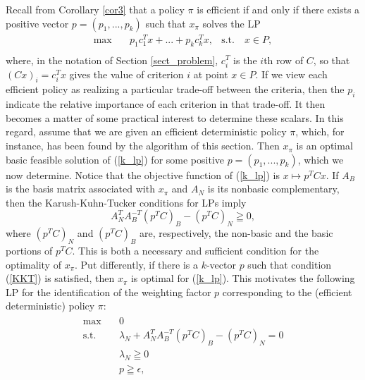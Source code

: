\documentclass{article}
\theoremstyle{definition}
\numberwithin{equation}{section}
\begin{document}

Recall from Corollary \ref{cor3} that a policy $\pi$ is efficient if and only if there exists a positive vector $p = (p_1, ..., p_k)$ such that $x_{\pi}$ solves the LP \begin{equation}
\tag{$P_p$}
\label{k_lp}
\begin{aligned}
\max \quad & p_{1}c_1^{T}x + ... + p_{k}c_k^{T}x, & \textrm{s.t.} \quad x \in P,\\
\end{aligned}
\end{equation}
where, in the notation of Section \ref{sect_problem}, $c_{i}^T$ is the $i$th row of $C$, so that $(Cx)_i=c_{i}^{T}x$ gives the value of criterion $i$ at point $x \in P$. If we view each efficient policy as realizing a particular trade-off between the criteria, then the $p_i$ indicate the relative importance of each criterion in that trade-off. It then becomes a matter of some practical interest to determine these scalars. In this regard, assume that we are given an efficient deterministic policy $\pi$, which, for instance, has been found by the algorithm of this section. Then $x_{\pi}$ is an optimal 
basic feasible solution of (\ref{k_lp}) for some positive $p = (p_1, ..., p_k)$, which we now determine. Notice that the objective function of (\ref{k_lp}) is $x \mapsto p^{T}Cx$. If $A_B$ is the basis matrix associated with $x_{\pi}$ and $A_N$ is its nonbasic complementary, then the Karush-Kuhn-Tucker conditions for LPs \cite{14} imply 
\begin{equation}
\label{KKT}
 A_N^{T}A_B^{-T}(p^{T}C)_B - (p^TC)_N \geqq 0,
\end{equation}   
where $(p^{T}C)_N$ and $(p^{T}C)_B$ are, respectively, the non-basic and the basic portions of $p^{T}C$. This is both a necessary and sufficient condition for the optimality of $x_{\pi}$. Put differently, if there is a $k$-vector $p$ such that condition (\ref{KKT}) is satisfied, then $x_{\pi}$ is optimal for (\ref{k_lp}). This motivates the following LP for the identification of the weighting factor $p$ corresponding to the (efficient deterministic) policy $\pi$:
\begin{equation}
\label{test2}
\begin{aligned}
\begin{split}
\max \quad & 0\\
\textrm{s.t.} \quad & \lambda_N  + A_N^{T}A_B^{-T}(p^{T}C)_B - (p^TC)_N= 0\\
  & \lambda_N \geqq 0  \\
  & p \geqq \epsilon,
  \end{split}
\end{aligned}
\end{equation}
\end{document}
